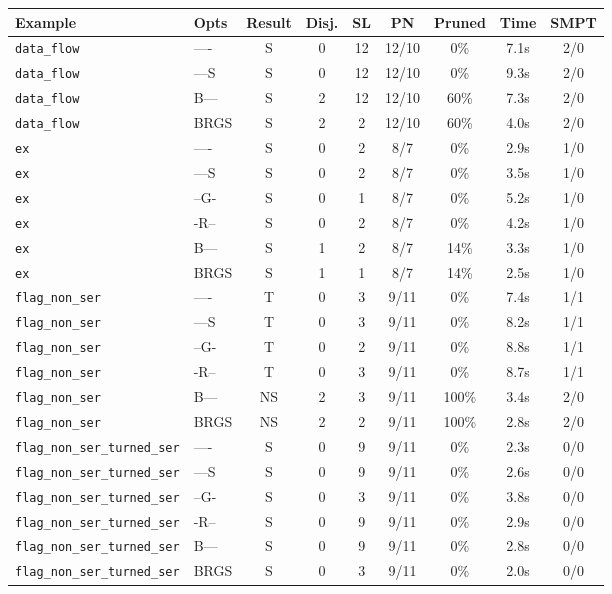 \begin{tabular}{llccccccc}
\toprule
Example & Opts & Result & Disj. & SL & PN & Pruned & Time & SMPT \\
\midrule
\texttt{data_flow} & ---- & S & 0 & 12 & 12/10 & 0\% & 7.1s & 2/0 \\
\texttt{data_flow} & ---S & S & 0 & 12 & 12/10 & 0\% & 9.3s & 2/0 \\
\texttt{data_flow} & B--- & S & 2 & 12 & 12/10 & 60\% & 7.3s & 2/0 \\
\texttt{data_flow} & BRGS & S & 2 & 2 & 12/10 & 60\% & 4.0s & 2/0 \\
\texttt{ex} & ---- & S & 0 & 2 & 8/7 & 0\% & 2.9s & 1/0 \\
\texttt{ex} & ---S & S & 0 & 2 & 8/7 & 0\% & 3.5s & 1/0 \\
\texttt{ex} & --G- & S & 0 & 1 & 8/7 & 0\% & 5.2s & 1/0 \\
\texttt{ex} & -R-- & S & 0 & 2 & 8/7 & 0\% & 4.2s & 1/0 \\
\texttt{ex} & B--- & S & 1 & 2 & 8/7 & 14\% & 3.3s & 1/0 \\
\texttt{ex} & BRGS & S & 1 & 1 & 8/7 & 14\% & 2.5s & 1/0 \\
\texttt{flag_non_ser} & ---- & T & 0 & 3 & 9/11 & 0\% & 7.4s & 1/1 \\
\texttt{flag_non_ser} & ---S & T & 0 & 3 & 9/11 & 0\% & 8.2s & 1/1 \\
\texttt{flag_non_ser} & --G- & T & 0 & 2 & 9/11 & 0\% & 8.8s & 1/1 \\
\texttt{flag_non_ser} & -R-- & T & 0 & 3 & 9/11 & 0\% & 8.7s & 1/1 \\
\texttt{flag_non_ser} & B--- & NS & 2 & 3 & 9/11 & 100\% & 3.4s & 2/0 \\
\texttt{flag_non_ser} & BRGS & NS & 2 & 2 & 9/11 & 100\% & 2.8s & 2/0 \\
\texttt{flag_non_ser_turned_ser} & ---- & S & 0 & 9 & 9/11 & 0\% & 2.3s & 0/0 \\
\texttt{flag_non_ser_turned_ser} & ---S & S & 0 & 9 & 9/11 & 0\% & 2.6s & 0/0 \\
\texttt{flag_non_ser_turned_ser} & --G- & S & 0 & 3 & 9/11 & 0\% & 3.8s & 0/0 \\
\texttt{flag_non_ser_turned_ser} & -R-- & S & 0 & 9 & 9/11 & 0\% & 2.9s & 0/0 \\
\texttt{flag_non_ser_turned_ser} & B--- & S & 0 & 9 & 9/11 & 0\% & 2.8s & 0/0 \\
\texttt{flag_non_ser_turned_ser} & BRGS & S & 0 & 3 & 9/11 & 0\% & 2.0s & 0/0 \\

\end{tabular}
